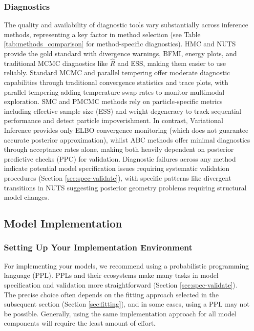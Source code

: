 \documentclass{article}
\begin{document}
\subsubsection{Diagnostics}

The quality and availability of diagnostic tools vary substantially across inference methods, representing a key factor in method selection (see Table \ref{tab:methods_comparison} for method-specific diagnostics).
HMC and NUTS provide the gold standard with divergence warnings, BFMI, energy plots, and traditional MCMC diagnostics like $\hat{R}$ and ESS, making them easier to use reliably.
Standard MCMC and parallel tempering offer moderate diagnostic capabilities through traditional convergence statistics and trace plots, with parallel tempering adding temperature swap rates to monitor multimodal exploration.
SMC and PMCMC methods rely on particle-specific metrics including effective sample size (ESS) and weight degeneracy to track sequential performance and detect particle impoverishment. 
In contrast, Variational Inference provides only ELBO convergence monitoring (which does not guarantee accurate posterior approximation), whilst ABC methods offer minimal diagnostics through acceptance rates alone, making both heavily dependent on posterior predictive checks (PPC) for validation.
Diagnostic failures across any method indicate potential model specification issues requiring systematic validation procedures (Section \ref{sec:spec-validate}), with specific patterns like divergent transitions in NUTS suggesting posterior geometry problems requiring structural model changes.

\subsection{Model Implementation}\label{sec:implementation}

\subsubsection{Setting Up Your Implementation Environment}

For implementing your models, we recommend using a probabilistic programming language (PPL).
PPLs and their ecosystems make many tasks in model specification and validation more straightforward (Section \ref{sec:spec-validate}).
The precise choice often depends on the fitting approach selected in the subsequent section (Section \ref{sec:fitting}), and in some cases, using a PPL may not be possible.
Generally, using the same implementation approach for all model components will require the least amount of effort.
\end{document}

